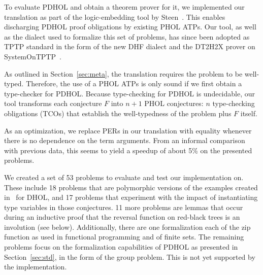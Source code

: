 


To evaluate PDHOL and obtain a theorem prover for it, we implemented our translation as part of the
logic-embedding tool by Steen~\cite{leo_embedding}.
This enables discharging PDHOL proof obligations by existing PHOL ATPs.
Our tool, as well as the dialect used to formalize this set of problems, has since been adopted as TPTP standard in the form of the new DHF dialect and the DT2H2X prover on
SystemOnTPTP~\cite{R+25}.

As outlined in Section~\ref{sec:meta}, the translation requires the problem to be well-typed.
Therefore, the use of a PHOL ATPs is only sound if we first obtain a type-checker for PDHOL.
Because type-checking for PDHOL is undecidable, our tool transforms each conjecture $F$ into $n+1$ PHOL conjectures:
$n$ type-checking obligations (TCOs) that establish the well-typedness of the problem plus $F$ itself.

As an optimization, we replace PERs in our translation with equality whenever there is no dependence on the term arguments.
From an informal comparison with previous data, this seems to yield a speedup of about 5\% on
the presented problems.

We created a set of 53 problems to evaluate and test our implementation on.
These include 18 problems that are polymorphic versions of the examples created in~\cite{dhol_satallax} for DHOL, and 17 problems that experiment with the impact of instantiating type variables in those conjectures.
11 more problems are lemmas that occur during an inductive proof that the reversal function on
red-black trees is an involution (see below).
Additionally, there are one formalization each of the zip function as used in functional
programming and of finite sets.
The remaining problems focus on the formalization capabilities of PDHOL as presented in
Section~\ref{sec:std}, in the form of the group problem. This is not yet supported by the
implementation.


